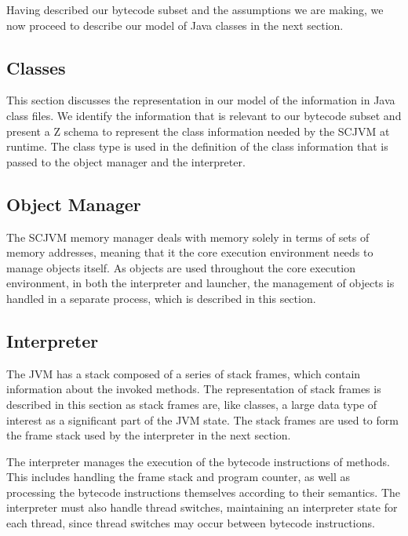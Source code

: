 Having described our bytecode subset and the assumptions we are
making, we now proceed to describe our model of Java classes in the
next section.

\subsection{Classes}
\label{cee-classes-subsection}

This section discusses the representation in our model of the
information in Java class files.
We identify the information that is relevant to our bytecode subset
and present a Z schema to represent the class information needed by
the SCJVM at runtime.
The class type is used in the definition of the class information that
is passed to the object manager and the interpreter.



\subsection{Object Manager}
\label{cee-object-manager-subsection}

The SCJVM memory manager deals with memory solely in terms of sets of
memory addresses, meaning that it the core execution environment needs
to manage objects itself.
As objects are used throughout the core execution environment, in both
the interpreter and launcher, the management of objects is handled in
a separate \Circus{} process, which is described in this section.



\subsection{Interpreter}
\label{cee-interpreter-subsection}

The JVM has a stack composed of a series of stack frames, which
contain information about the invoked methods.
The representation of stack frames is described in this section as
stack frames are, like classes, a large data type of interest as a
significant part of the JVM state.
The stack frames are used to form the frame stack used by the
interpreter in the next section.



The interpreter manages the execution of the bytecode instructions of
methods.
This includes handling the frame stack and program counter, as well as
processing the bytecode instructions themselves according to their
semantics.
The interpreter must also handle thread switches, maintaining an
interpreter state for each thread, since thread switches may occur
between bytecode instructions.

